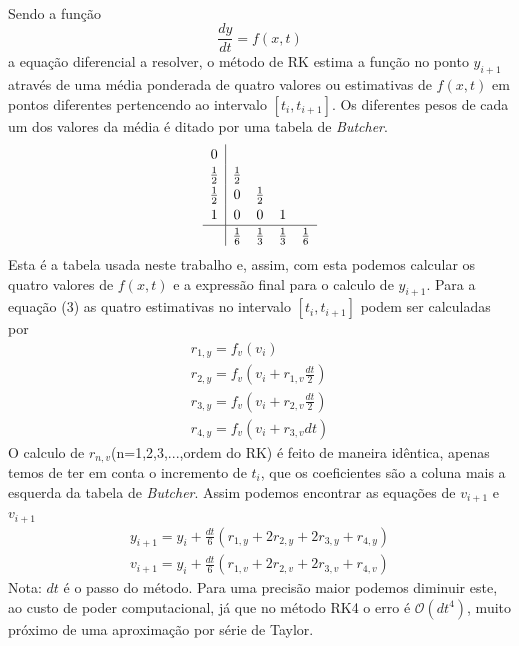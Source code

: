 \documentclass[a4paper, 11pt]{article}
\newcommand{\dydt}{\frac{dy}{dt}}
\begin{document}
	\paragraph{}
	Sendo a função 
	\begin{equation*}
		\dydt = f(x, t)
	\end{equation*}
	a equação diferencial a resolver, o método de RK estima a função no ponto $y_{i+1}$ através de uma média ponderada de quatro valores ou estimativas de $f(x, t)$ em pontos diferentes pertencendo ao intervalo $\left[t_{i}, t_{i+1}\right]$.
	Os diferentes pesos de cada um dos valores da média é ditado por uma tabela de \textit{Butcher}.
	\[
	\renewcommand\arraystretch{1.2}
	\begin{array}
	{c|cccc}
	0\\
	\frac{1}{2} & \frac{1}{2}\\
	\frac{1}{2} &0 &\frac{1}{2} \\
	1& 0& 0& 1\\
	\hline
	& \frac{1}{6} &\frac{1}{3} &\frac{1}{3} &\frac{1}{6} 
	\end{array}
	\]
	Esta é a tabela usada neste trabalho e, assim, com esta podemos calcular os quatro valores de $f(x, t)$ e a expressão final para o calculo de $y_{i+1}$. Para a equação (3) as quatro estimativas no intervalo $\left[t_{i}, t_{i+1}\right]$ podem ser calculadas por
	\begin{gather*}
		r_{1,y}=f_{v}\left(v_{i}\right)\\
		r_{2,y}=f_{v}\left(v_{i}+r_{1,v}\frac{dt}{2}\right)\\
		r_{3,y}=f_{v}\left(v_{i}+r_{2,v}\frac{dt}{2}\right)\\
		r_{4,y}=f_{v}\left(v_{i}+r_{3,v}dt\right)
	\end{gather*}
	O calculo de $r_{n,v}$(n=1,2,3,...,ordem do RK) é feito de maneira idêntica, apenas temos de ter em conta o incremento de $t_{i}$, que os coeficientes são a coluna mais a esquerda da tabela de \textit{Butcher}. Assim podemos encontrar as equações de $v_{i+1}$ e $v_{i+1}$
	\begin{gather}
		y_{i+1}=y_{i}+\frac{dt}{6}\left(r_{1,y}+2r_{2,y}+2r_{3,y}+r_{4,y}\right)\\
		v_{i+1}=y_{i}+\frac{dt}{6}\left(r_{1,v}+2r_{2,v}+2r_{3,v}+r_{4,v}\right)
	\end{gather}
	{\footnotesize Nota: $dt$ é o passo do método. Para uma precisão maior podemos diminuir este, ao custo de poder computacional, já que no método RK4 o erro é $\mathcal{O}(dt^{4})$, muito próximo de uma aproximação por série de Taylor.}
	
\end{document}
